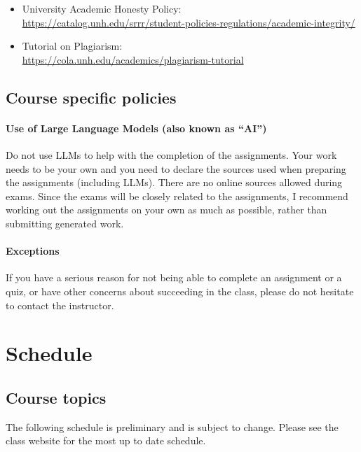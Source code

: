 \documentclass[11pt]{article}
\begin{document}
\begin{itemize}[noitemsep]
\item University Academic Honesty Policy:\\
  \url{https://catalog.unh.edu/srrr/student-policies-regulations/academic-integrity/}
\item Tutorial on Plagiarism: \\
  \url{https://cola.unh.edu/academics/plagiarism-tutorial}
\end{itemize}

\subsection{Course specific policies}

\paragraph{Use of Large Language Models (also known as ``AI'')} Do not use LLMs to help with the completion of the assignments. Your work needs to be your own and you need to declare the sources used when preparing the assignments (including LLMs). There are no online sources allowed during exams. Since the exams will be closely related to the assignments, I recommend working out the assignments on your own as much as possible, rather than submitting generated work.

\paragraph{Exceptions} If you have a serious reason for not being able to complete an assignment or a quiz, or have other concerns about succeeding in the class, please do not hesitate to contact the instructor.

\section{Schedule}

\subsection{Course topics}

The following schedule is preliminary and is subject to change. Please see the class website for the most up to date schedule.
\end{document}
